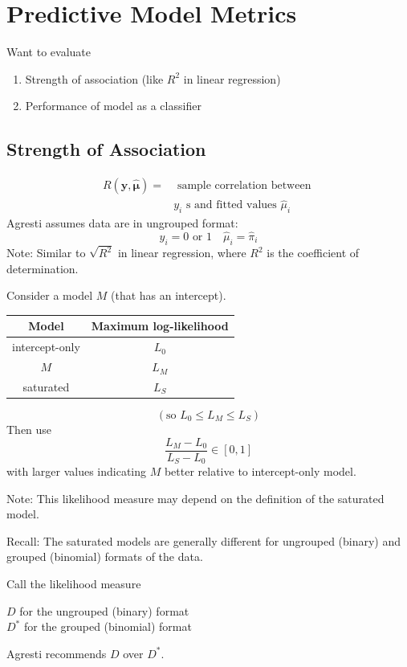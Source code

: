 \documentclass[11pt]{elegantbook}
\begin{document}
\section{Predictive Model Metrics}
Want to evaluate
\begin{enumerate}
    \item Strength of association (like $R^2$ in linear regression)
    \item Performance of model as a classifier
\end{enumerate}

\subsection{Strength of Association}
\begin{definition}
\normalfont
$$
\begin{aligned}
R(\boldsymbol{y}, \hat{\boldsymbol{\mu}})= & \text { sample correlation between } \\
& y_i \text { s and fitted values } \hat{\mu}_i
\end{aligned}
$$
Agresti assumes data are in ungrouped format:
$$
y_i=0 \text { or } 1 \quad \hat{\mu}_i=\hat{\pi}_i
$$
Note: Similar to $\sqrt{R^2}$ in linear regression, where $R^2$ is the coefficient of determination.
\end{definition}

\begin{definition}
\normalfont
Consider a model $M$ (that has an intercept).
\begin{center}
    \begin{tabular}{cc} 
        Model & Maximum log-likelihood \\
        \hline intercept-only & $L_0$ \\
        $M$ & $L_M$ \\
        saturated & $L_S$
    \end{tabular}
\end{center}
$$
(\text {so } L_0 \leq L_M \leq L_S)
$$
Then use
$$
\frac{L_M-L_0}{L_S-L_0} \in[0,1]
$$
with larger values indicating $M$ better relative to intercept-only model.

Note: This likelihood measure may depend on the definition of the saturated model.

Recall: The saturated models are generally different for ungrouped (binary) and grouped (binomial) formats of the data.

Call the likelihood measure
\begin{center}
    $D$ for the ungrouped (binary) format\\
    $D^*$ for the grouped (binomial) format
\end{center}
Agresti recommends $D$ over $D^*$.
\end{definition}
\end{document}
